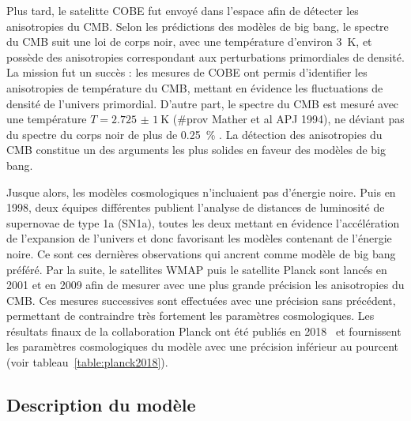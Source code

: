 \documentclass[11pt, twoside, a4paper, openright]{report}
\begin{document}
Plus tard, le satelitte COBE fut envoyé dans l'espace afin de détecter les anisotropies du CMB. Selon les prédictions des modèles de big bang, le spectre du CMB suit une loi de corps noir, avec une température d'environ \SI{3}{\kelvin}, et possède des anisotropies correspondant aux perturbations primordiales de densité. La mission fut un succès : les mesures de COBE ont permis d'identifier les anisotropies de température du CMB, mettant en évidence les fluctuations de densité de l'univers primordial. D'autre part, le spectre du CMB est mesuré avec une température $T = \SI{2,725(1)}{\kelvin}$ (\#prov Mather et al APJ 1994), ne déviant pas du spectre du corps noir de plus de \SI{0,25}{\percent} \cite{CITE:https://www.ncbi.nlm.nih.gov/pmc/articles/PMC46596/}. La détection des anisotropies du CMB constitue un des arguments les plus solides en faveur des modèles de big bang.

Jusque alors, les modèles cosmologiques n'incluaient pas d'énergie noire. Puis en 1998, deux équipes différentes publient l'analyse de distances de luminosité de supernovae de type 1a (SN1a), toutes les deux mettant en évidence l'accélération de l'expansion de l'univers et donc favorisant les modèles contenant de l'énergie noire. Ce sont ces dernières observations qui ancrent \lcdm{} comme modèle de big bang préféré. Par la suite, le satellites WMAP puis le satellite Planck sont lancés en 2001 et en 2009 afin de mesurer avec une plus grande précision les anisotropies du CMB. Ces mesures successives sont effectuées avec une précision sans précédent, permettant de contraindre très fortement les paramètres cosmologiques. Les résultats finaux de la collaboration Planck ont été publiés en 2018~\cite{CITE:planck2018} et fournissent les paramètres cosmologiques du modèle \lcdm{} avec une précision inférieur au pourcent (voir tableau~\ref{table:planck2018}).

\subsection{Description du modèle}
\label{subsec:descri_mod}
\end{document}
